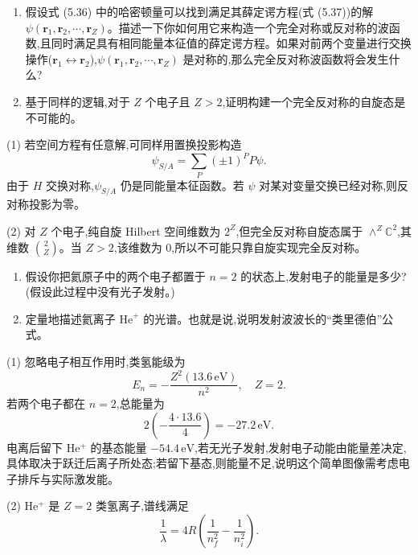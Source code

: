 \begin{question}
\begin{enumerate}
\item 假设式 (5.36) 中的哈密顿量可以找到满足其薛定谔方程(式 (5.37))的解 $\psi(\mathbf r_1,\mathbf r_2,\cdots,\mathbf r_Z)$。描述一下你如何用它来构造一个完全对称或反对称的波函数,且同时满足具有相同能量本征值的薛定谔方程。如果对前两个变量进行交换操作($\mathbf r_1\leftrightarrow\mathbf r_2$),$\psi(\mathbf r_1,\mathbf r_2,\cdots,\mathbf r_Z)$ 是对称的,那么完全反对称波函数将会发生什么?
\item 基于同样的逻辑,对于 $Z$ 个电子且 $Z>2$,证明构建一个完全反对称的自旋态是不可能的。
\end{enumerate}

\par\smallskip
{}

\end{question}
\begin{solution}

(1) 若空间方程有任意解,可同样用置换投影构造
\[
\psi_{S/A}=\sum_P(\pm1)^P P\psi.
\]
由于 $H$ 交换对称,$\psi_{S/A}$ 仍是同能量本征函数。若 $\psi$ 对某对变量交换已经对称,则反对称投影为零。

(2) 对 $Z$ 个电子,纯自旋 Hilbert 空间维数为 $2^Z$,但完全反对称自旋态属于 $\wedge^Z\mathbb C^2$,其维数 $\binom2Z$。当 $Z>2$,该维数为 0,所以不可能只靠自旋实现完全反对称。

\end{solution}

\begin{question}
\begin{enumerate}
\item 假设你把氦原子中的两个电子都置于 $n=2$ 的状态上,发射电子的能量是多少?(假设此过程中没有光子发射。)
\item 定量地描述氦离子 $\mathrm{He}^{+}$ 的光谱。也就是说,说明发射波波长的“类里德伯”公式。
\end{enumerate}
\end{question}
\begin{solution}

(1) 忽略电子相互作用时,类氢能级为
\[
E_n=-\frac{Z^2(13.6\,\mathrm{eV})}{n^2},\quad Z=2.
\]
若两个电子都在 $n=2$,总能量为
\[
2\left(-\frac{4\cdot13.6}{4}\right)=-27.2\,\mathrm{eV}.
\]
电离后留下 He$^+$ 的基态能量 $-54.4\,\mathrm{eV}$,若无光子发射,发射电子动能由能量差决定,具体取决于跃迁后离子所处态;若留下基态,则能量不足,说明这个简单图像需考虑电子排斥与实际激发能。

(2) He$^+$ 是 $Z=2$ 类氢离子,谱线满足
\[
\frac1\lambda=4R\left(\frac1{n_f^2}-\frac1{n_i^2}\right).
\]

\end{solution}

